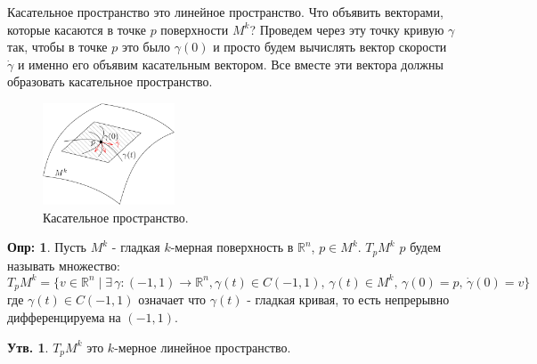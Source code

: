\documentclass[12pt]{article}
\newcommand{\MR}{\mathbb{R}}
\theoremstyle{definition}
\newtheorem{defn}{Опр:}
\newtheorem{prop}{Утв.}
\begin{document}
Касательное пространство это линейное пространство. Что объявить векторами, которые касаются в точке $p$ поверхности $M^k$? Проведем через эту точку кривую $\gamma$ так, чтобы в точке $p$ это было $\gamma(0)$ и просто будем вычислять вектор скорости $\dot{\gamma}$ и именно его объявим касательным вектором. Все вместе эти вектора должны образовать касательное пространство.
\begin{figure}[H]
	\centering
	\includegraphics[width=0.35\textwidth]{19_9.png}
	\caption{Касательное пространство.}
	\label{19_9}
\end{figure}
\begin{defn}
	Пусть $M^k$ - гладкая $k$-мерная поверхность в $\MR^n$, $p \in M^k$.  $T_pM^k$  $p$ будем называть множество:
	$$
		T_pM^k = \{v \in \MR^n \mid \exists \, \gamma \colon (-1,1) \to \MR^n, \gamma(t) \in C(-1,1), \,  \gamma(t) \in M^k, \, \gamma(0) = p, \, \dot{\gamma}(0) = v\}
	$$
	где $\gamma(t) \in C(-1,1)$ означает что $\gamma(t)$ - гладкая кривая, то есть непрерывно дифференцируема на $(-1,1)$.
\end{defn}
\begin{prop}
	$T_p M^k$ это $k$-мерное линейное пространство.
\end{prop}
\end{document}
